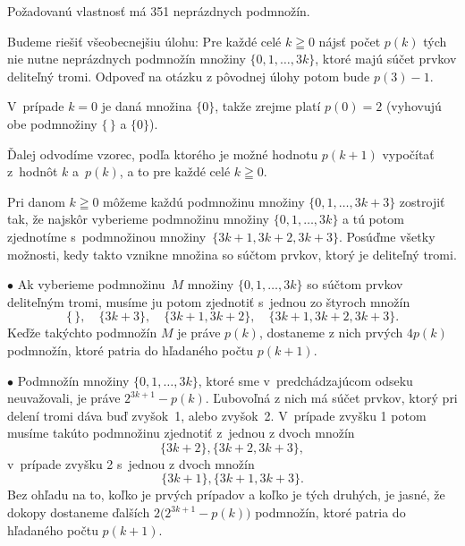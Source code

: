 {\zaver
Požadovanú vlastnosť má 351 neprázdnych podmnožín.

\ineriesenie
Budeme riešiť všeobecnejšiu úlohu: Pre každé celé $k\geqq0$ nájsť
počet $p(k)$ tých nie nutne neprázdnych podmnožín množiny
$\{0,1,\ldots,3k\}$, ktoré majú súčet prvkov deliteľný
tromi.
Odpoveď na otázku z pôvodnej úlohy potom bude $p(3)-1$.

V~prípade $k=0$ je daná množina $\{0\}$, takže zrejme platí
$p(0)=2$ (vyhovujú obe podmnožiny $\{\,\}$ a $\{0\}$).

Ďalej odvodíme vzorec, podľa ktorého je možné hodnotu $p(k+1)$
vypočítať z~hodnôt $k$ a~$p(k)$, a to pre každé
celé $k\geqq0$.

Pri danom $k\geqq0$ môžeme každú podmnožinu množiny
$\{0,1,\ldots,3k+3\}$ zostrojiť tak, že najskôr vyberieme
podmnožinu množiny $\{0,1,\ldots,3k\}$ a tú potom
zjednotíme s~podmnožinou množiny~$\{3k+1,3k+2,3k+3\}$.
Posúďme všetky možnosti, kedy takto vznikne
množina so súčtom prvkov, ktorý je deliteľný tromi.

\smallskip

\item{$\bullet$}
Ak vyberieme podmnožinu~$M$ množiny $\{0,1,\ldots,3k\}$ so súčtom
prvkov deliteľným tromi, musíme ju potom zjednotiť s~jednou zo štyroch
množín
$$
\{\,\},\quad\{3k+3\},\quad \{3k+1,3k+2\},\quad \{3k+1,3k+2,3k+3\}.
$$
Keďže takýchto podmnožín $M$ je práve $p(k)$, dostaneme z nich
prvých $4p(k)$ podmnožín, ktoré patria do hľadaného počtu $p(k+1)$.

\item{$\bullet$}
Podmnožín množiny $\{0,1,\ldots,3k\}$, ktoré sme v~predchádzajúcom
odseku neuvažovali, je práve $2^{3k+1}-p(k)$.
Ľubovoľná z nich má súčet prvkov, ktorý pri delení tromi dáva
buď zvyšok~1, alebo zvyšok~2. V~prípade zvyšku 1 potom musíme
takúto podmnožinu zjednotiť z~jednou z dvoch množín
$$
\{3k+2\}, \{3k+2,3k+3\},
$$
v~prípade zvyšku 2 s~jednou z dvoch množín
$$
\{3k+1\}, \{3k+1,3k+3\}.
$$
Bez ohľadu na to, koľko je prvých prípadov a koľko je tých
druhých,
je jasné, že dokopy
dostaneme ďalších $2\bigl(2^{3k+1}-p(k)\bigr)$ podmnožín,
ktoré patria do hľadaného počtu $p(k+1)$.

}
